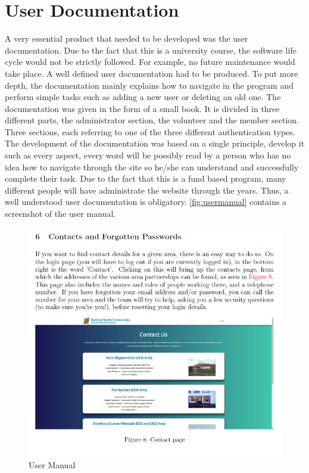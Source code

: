 \documentclass{l3proj}
\begin{document}
\section{User Documentation}
\label{sec:user_doc}
A very essential product that needed to be developed was the user documentation. Due to the fact that this is a university course, the software life cycle would not be strictly followed. For example, no future maintenance would take place. A well defined user documentation had to be produced. To put more depth, the documentation mainly explains how to navigate in the program and perform simple tasks such as adding a new user or deleting an old one. The documentation was given in the form of a small book. It is divided in three different parts, the administrator section, the volunteer and the member section. Three sections, each referring to one of the three different authentication types. The development of the documentation was based on a single principle, develop it such as every aspect, every word will be possibly read by a person who has no idea how to navigate through the site so he/she can understand and successfully complete their task. Due to the fact that this is a fund based program, many different people will have administrate the website through the years. Thus, a well understood user documentation is obligatory.
\autoref{fig:usermanual} contains a screenshot of the user manual.

\begin{figure}[ht]
\centerline{\includegraphics[width=\textwidth, height=\textheight, keepaspectratio]{usermanual.jpg}}
\caption{User Manual }
 \label{fig:usermanual}
\end{figure}
\end{document}
